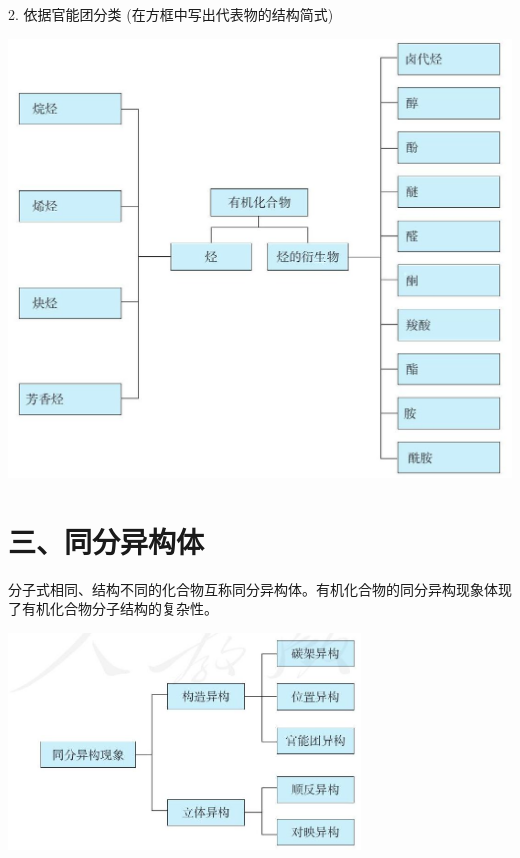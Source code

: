 \documentclass[10pt]{article}
\begin{document}
2. 依据官能团分类 (在方框中写出代表物的结构简式)

\begin{center}
\includegraphics[max width=1.0\textwidth]{images/0190efc5-b58a-7c43-bfb0-e0a030df9cfd_29_996358.jpg}
\end{center}

\section*{三、同分异构体}

分子式相同、结构不同的化合物互称同分异构体。有机化合物的同分异构现象体现了有机化合物分子结构的复杂性。

\begin{center}
\includegraphics[max width=0.7\textwidth]{images/0190efc5-b58a-7c43-bfb0-e0a030df9cfd_29_770146.jpg}
\end{center}
\end{document}

